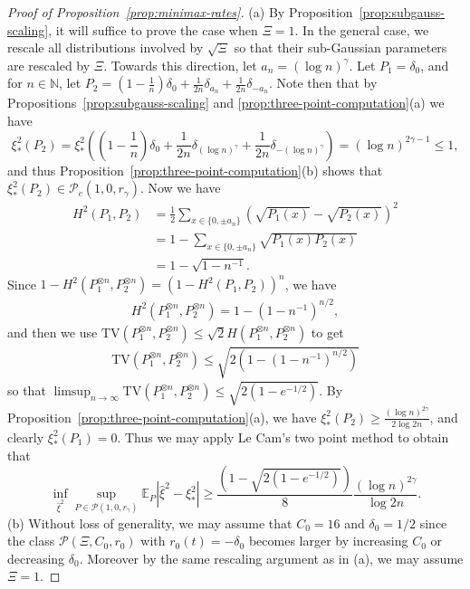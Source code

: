 \documentclass{article}
\theoremstyle{definition}
\newcommand{\N}{\mathbb{N}}
\newcommand{\E}{\mathbb{E}}
\newcommand{\1}{\mathbbm{1}}
\begin{document}
\begin{proof}[Proof of Proposition~\ref{prop:minimax-rates}]
(a) By Proposition~\ref{prop:subgauss-scaling}, it will suffice to prove the case when $\Xi = 1$. In the general case, we rescale all distributions involved by $\sqrt{\Xi}$ so that their sub-Gaussian parameters are rescaled by $\Xi$. Towards this direction, let $a_n =(\log n)^\gamma$. Let $P_1 = \delta_0$, and for $n \in \N$, let $P_2 = (1 - \frac{1}{n})\delta_0 + \frac{1}{2n}\delta_{ a_n} + \frac{1}{2n}\delta_{-a_n}$. Note then that by Propositions~\ref{prop:subgauss-scaling} and \ref{prop:three-point-computation}(a) we have 
\[
\xi_*^2(P_2) = \xi_*^2\left((1 - \frac{1}{n})\delta_0 + \frac{1}{2n}\delta_{(\log n)^\gamma} + \frac{1}{2n}\delta_{-(\log n)^\gamma}\right) =  (\log n)^{2\gamma - 1}\leq 1,
\]
and thus Proposition~\ref{prop:three-point-computation}(b) shows that $\xi_*^2(P_2) \in \mathcal P_c(1, 0, r_\gamma)$.
Now we have 
\begin{align*}
    H^2(P_1, P_2) &= \frac12 \sum_{x \in \{0, \pm a_n\}} \left(\sqrt{P_1(x)} - \sqrt{P_2(x)}\right)^2 \\ &= 1 - \sum_{x \in \{0, \pm a_n\}} \sqrt{P_1(x)P_2(x)} \\
    &= 1 - \sqrt{1 - n^{-1}}.
\end{align*}
Since $1 - H^2(P_1^{\otimes n}, P_2^{\otimes n}) = (1 - H^2(P_1, P_2))^n$, we have 
\begin{align*}
    H^2(P_1^{\otimes n}, P_2^{\otimes n})  = 1 - \left( 1- n^{-1}\right)^{n/2},
\end{align*}
and then we use $\mathrm{TV}(P^{\otimes n}_1, P^{\otimes n}_2) \leq \sqrt 2 H(P^{\otimes n}_1, P^{\otimes n}_2)$ to get 
\begin{align*}
    \mathrm{TV}(P^{\otimes n}_1, P^{\otimes n}_2) \leq \sqrt{2\left(1 - (1 - n^{-1})^{n/2}\right)}
\end{align*}
so that $\limsup_{n \to \infty} \mathrm{TV}(P^{\otimes n}_1, P^{\otimes n}_2) \leq \sqrt{2(1 - e^{-1/2})}$. By Proposition~\ref{prop:three-point-computation}(a), we have $\xi_*^2(P_2) \geq \frac{(\log n)^{2\gamma}}{2 \log 2n}$, and clearly $\xi_*^2(P_1) = 0$. Thus we may apply Le Cam's two point method to obtain that
    \[
    \inf_{\hat \xi^2} \sup_{P \in \mathcal P(1, 0, r_\gamma)} \E_P|\hat \xi^2 - \xi_*^2| \geq \frac{\left(1 - \sqrt{2(1 - e^{-1/2})}\right)}{8}\frac{(\log n)^{2\gamma}}{\log 2n}.
    \] 
    (b) Without loss of generality, we may assume that $C_0 = 16$ and $\delta_0 = 1/2$ since the class $\mathcal{P}(\Xi, C_0, r_0)$ with $r_0(t) = -\delta_0$ becomes larger by increasing $C_0$ or decreasing $\delta_0$. Moreover by the same rescaling argument as in (a), we may assume $\Xi = 1$.
    

\end{proof}
\end{document}

